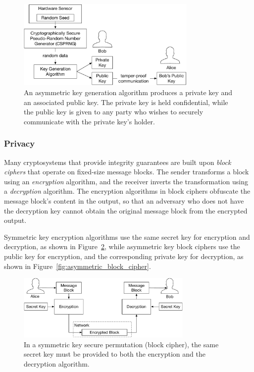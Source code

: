\begin{figure}[hbt]
  \centering
  \includegraphics[width=87mm]{figures/asymmetric_key_generation.pdf}
  \caption{
    An asymmetric key generation algorithm produces a private key and an
    associated public key. The private key is held confidential, while the
    public key is given to any party who wishes to securely communicate with
    the private key's holder.
  }
  \label{fig:asymmetric_key_generation}
\end{figure}


\subsubsection{Privacy}
\label{sec:privacy_crypto}

Many cryptosystems that provide integrity guarantees are built upon
\textit{block ciphers} that operate on fixed-size message blocks. The sender
transforms a block using an \textit{encryption} algorithm, and the receiver
inverts the transformation using a \textit{decryption} algorithm. The
encryption algorithms in block ciphers obfuscate the message block's content in
the output, so that an adversary who does not have the decryption key cannot
obtain the original message block from the encrypted output.

Symmetric key encryption algorithms use the same secret key for encryption and
decryption, as shown in Figure~\ref{fig:symmetric_block_cipher}, while
asymmetric key block ciphers use the public key for encryption, and the
corresponding private key for decryption, as shown in
Figure~\ref{fig:asymmetric_block_cipher}.
\begin{figure}[hbt]
  \centering
  \includegraphics[width=85mm]{figures/symmetric_block_cipher.pdf}
  \caption{
    In a symmetric key secure permutation (block cipher), the same secret key
    must be provided to both the encryption and the decryption algorithm.
  }
  \label{fig:symmetric_block_cipher}
\end{figure}

